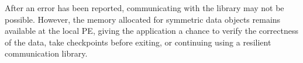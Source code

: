 After an error has been reported, communicating with the \openshmem
library may not be possible. However, the memory allocated for
symmetric data objects remains available at the local \ac{PE}, giving the
application a chance to verify the correctness of the data, take checkpoints
before exiting, or continuing using a resilient communication library.
